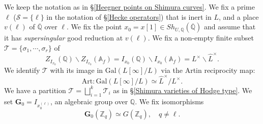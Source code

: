 \documentclass[11pt,oneside,reqno]{amsart}
\newcommand{\Art}{\mathrm{Art}}
\newcommand{\Gal}{\mathrm{Gal}}
\newcommand{\A}{\mathbb{A}}
\newcommand{\Q}{\mathbb{Q}}
\newcommand{\Z}{\mathbb{Z}}
\newcommand{\Scal}{\mathcal{S}}
\newcommand{\Tcal}{\mathcal{T}}
\newcommand{\Gbf}{\mathbf{G}}
\theoremstyle{plain}
\begin{document}
	We keep the notation as in §\ref{Heegner points on Shimura curves}. We fix a prime $\ell$ ($\Scal=\{\ell\}$ in the notation of §\ref{Hecke operators}) that is inert in $L$, and a place $v(\ell)$ of $\overline{\Q}$ over $\ell$. We fix the point $x_0=x[1]\in Sh_{U,\Q}(\overline{\Q})$ and assume that it has \emph{supersingular} good reduction at $v(\ell)$. We fix a non-empty finite subset $\Tcal=\{\sigma_1,\cdots,\sigma_r\}$ of
	\[
	Z_{I_{x_0}}(\Q)\backslash Z_{I_{x_0}}(\A_f)=I_{x_0}(\Q)\backslash I_{x_0}(\A_f)=L^\times\backslash \widehat{L}^\times.
	\]
	We identify $\Tcal$ with its image in $\Gal(L[\infty]/L)$ via the Artin reciprocity map:
	\begin{equation}\label{Artin map}
		\Art
		\colon
		\Gal(L[\infty]/L)
		\simeq
		\widehat{L}^\times/L^\times.
	\end{equation}
	We have a partition $\Tcal=\bigsqcup_{i=1}^k\Tcal_i$ as in §\ref{Shimura varieties of Hodge type}. We set $\Gbf_0=I_{x_0^{(\ell)}}$, an algebraic group over $\Q$.
	We fix isomorphisms
	\begin{equation}\label{G_0(Z_q)=R_q}
		\Gbf_0(\Z_q)
		\simeq
		G(\Z_q),
		\quad
		q\neq\ell.
	\end{equation}
	
	
	
\end{document}
